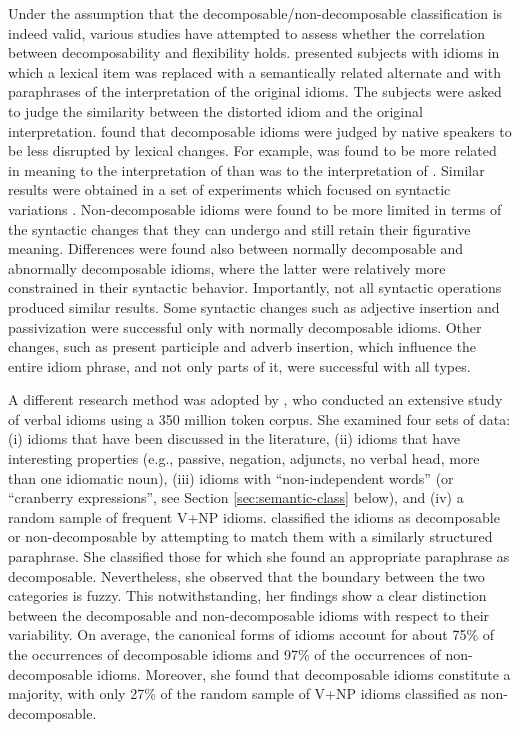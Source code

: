 \documentclass[output=paper]{langsci/langscibook}
\begin{document}
Under the assumption that the decomposable/non-decomposable
classification is indeed valid, various studies have attempted to
assess whether the correlation between decomposability and flexibility
holds.
\citet{gibbs89} presented subjects with idioms in which a lexical item was replaced with a semantically related alternate and with paraphrases of the interpretation of the original idioms. The subjects were asked to judge the similarity between the distorted idiom and the original interpretation. \citeauthor{Gibbs89} found that decomposable idioms were judged by native speakers to be less disrupted by lexical changes. For example,  was found to be more related in meaning to the interpretation of  than  was to the interpretation of . Similar results were obtained in a set of experiments which focused on syntactic variations \citep{gibbsnayak89psycho}. Non-decomposable idioms were found to be more limited in terms of the syntactic changes that they can undergo and still retain their figurative meaning. Differences were found also between normally decomposable and abnormally decomposable idioms, where the latter were relatively more constrained in their syntactic behavior. Importantly, not all syntactic operations produced similar results. Some syntactic changes such as adjective insertion and passivization were successful only with normally decomposable idioms. Other changes, such as present participle and adverb insertion, which influence the entire idiom phrase, and not only parts of it, were successful with all types.


A different research method was adopted by \citet{riehemann01}, who conduct\-ed an extensive study of verbal idioms using
a 350 million token corpus. She examined four sets of data: (i) idioms
that have been discussed in the literature, (ii) idioms that have
interesting properties (e.g., passive, negation, adjuncts, no verbal
head, more than one idiomatic noun), (iii) idioms with ``non-independent words'' (or ``cranberry expressions'', see Section \ref{sec:semantic-class} below),
and (iv) a random sample of frequent V+NP idioms. \citeauthor{Riehemann01} classified the idioms as decomposable or non-decomposable by attempting to match them with a similarly structured paraphrase. She classified those for which she found an appropriate paraphrase as decomposable. Nevertheless, she observed that the boundary between the two categories is fuzzy. This notwithstanding, her findings show a clear distinction between the decomposable and non-decomposable idioms with respect to their variability.  On average, the canonical forms of idioms account
for about 75\% of the occurrences of decomposable idioms and 97\% of
the occurrences of non-decomposable idioms. Moreover, she found that
decomposable idioms constitute a majority, with only 27\% of the
random sample of V+NP idioms classified as non-decomposable.
\end{document}
